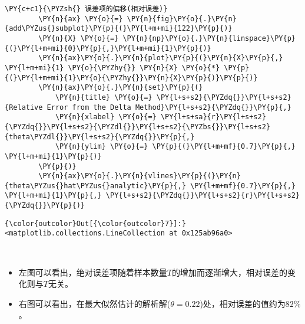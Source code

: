 \begin{Verbatim}[commandchars=\\\{\}]
        \PY{c+c1}{\PYZsh{} 误差项的偏移(相对误差)}
        \PY{n}{ax} \PY{o}{=} \PY{n}{fig}\PY{o}{.}\PY{n}{add\PYZus{}subplot}\PY{p}{(}\PY{l+m+mi}{122}\PY{p}{)}
        \PY{n}{X} \PY{o}{=} \PY{n}{np}\PY{o}{.}\PY{n}{linspace}\PY{p}{(}\PY{l+m+mi}{0}\PY{p}{,}\PY{l+m+mi}{1}\PY{p}{)}
        \PY{n}{ax}\PY{o}{.}\PY{n}{plot}\PY{p}{(}\PY{n}{X}\PY{p}{,} \PY{l+m+mi}{1} \PY{o}{\PYZhy{}} \PY{n}{X} \PY{o}{*} \PY{p}{(}\PY{l+m+mi}{1}\PY{o}{\PYZhy{}}\PY{n}{X}\PY{p}{)}\PY{p}{)}
        \PY{n}{ax}\PY{o}{.}\PY{n}{set}\PY{p}{(}
            \PY{n}{title} \PY{o}{=} \PY{l+s+s2}{\PYZdq{}}\PY{l+s+s2}{Relative Error from the Delta Method}\PY{l+s+s2}{\PYZdq{}}\PY{p}{,}
            \PY{n}{xlabel} \PY{o}{=} \PY{l+s+sa}{r}\PY{l+s+s2}{\PYZdq{}}\PY{l+s+s2}{\PYZdl{}}\PY{l+s+s2}{\PYZbs{}}\PY{l+s+s2}{theta\PYZdl{}}\PY{l+s+s2}{\PYZdq{}}\PY{p}{,}
            \PY{n}{ylim} \PY{o}{=} \PY{p}{(}\PY{l+m+mf}{0.7}\PY{p}{,} \PY{l+m+mi}{1}\PY{p}{)}
        \PY{p}{)}
        \PY{n}{ax}\PY{o}{.}\PY{n}{vlines}\PY{p}{(}\PY{n}{theta\PYZus{}hat\PYZus{}analytic}\PY{p}{,} \PY{l+m+mf}{0.7}\PY{p}{,} \PY{l+m+mi}{1}\PY{p}{,} \PY{l+s+s2}{\PYZdq{}}\PY{l+s+s2}{r}\PY{l+s+s2}{\PYZdq{}}\PY{p}{)}
\end{Verbatim}

            \begin{Verbatim}[commandchars=\\\{\}]
{\color{outcolor}Out[{\color{outcolor}7}]:} <matplotlib.collections.LineCollection at 0x125ab96a0>
\end{Verbatim}

    \begin{center}
    \end{center}
    { \hspace*{\fill} \\}

    \begin{itemize}
\tightlist
\item
  左图可以看出，绝对误差项随着样本数量\(T\)的增加而逐渐增大，相对误差的变化则与\(T\)无关。
\item
  右图可以看出，在最大似然估计的解析解(\(\theta = 0.22\))处，相对误差的值约为\(82\%\)。
\end{itemize}

